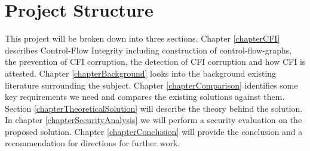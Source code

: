 \section{Project Structure}

This project will be broken down into three sections. Chapter \ref{chapterCFI} describes Control-Flow Integrity including construction of control-flow-graphs, the prevention of CFI corruption, the detection of CFI corruption and how CFI is attested. Chapter \ref{chapterBackground} looks into the background existing literature surrounding the subject. Chapter \ref{chapterComparison} identifies some key requirements we need and compares the existing solutions against them. Section \ref{chapterTheoreticalSolution} will describe the theory behind the solution. In chapter \ref{chapterSecurityAnalysis} we will perform a security evaluation on the proposed solution. Chapter \ref{chapterConclusion} will provide the conclusion and a recommendation for directions for further work.